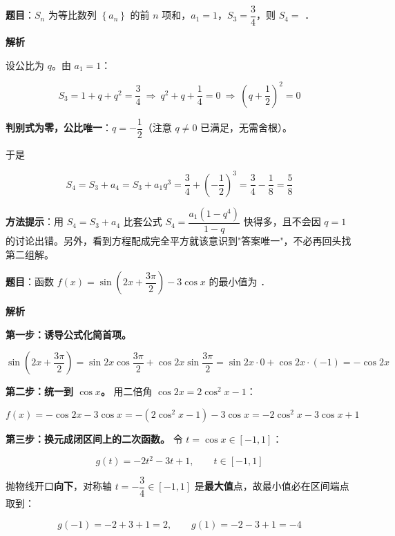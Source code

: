 
\par\medskip


\textbf{题目}：$S_n$ 为等比数列 $\left\{a_n\right\}$ 的前 $n$ 项和，$a_1=1$，$S_3=\dfrac34$，则 $S_4=$ \gkblank{}．

\textbf{解析}

设公比为 $q$。由 $a_1=1$：

\[S_3=1+q+q^{2}=\frac34\ \Longrightarrow\ q^{2}+q+\frac14=0\ \Longrightarrow\ \left(q+\frac12\right)^{2}=0\]

\textbf{判别式为零，公比唯一}：$q=-\dfrac12$（注意 $q\ne0$ 已满足，无需舍根）。

于是

\[S_4=S_3+a_4=S_3+a_1q^{3}=\frac34+\left(-\frac12\right)^{3}=\frac34-\frac18=\frac58\]


\begin{gktip}
\textbf{方法提示}：用 $S_4=S_3+a_4$ 比套公式 $S_4=\dfrac{a_1\left(1-q^{4}\right)}{1-q}$ 快得多，且不会因 $q=1$ 的讨论出错。另外，看到方程配成完全平方就该意识到"答案唯一"，不必再回头找第二组解。
\end{gktip}

\par\medskip


\textbf{题目}：函数 $f(x)=\sin\left(2x+\dfrac{3\pi}2\right)-3\cos x$ 的最小值为 \gkblank{}．

\textbf{解析}

\textbf{第一步：诱导公式化简首项。}

\[\sin\left(2x+\frac{3\pi}2\right)=\sin2x\cos\frac{3\pi}2+\cos2x\sin\frac{3\pi}2=\sin2x\cdot0+\cos2x\cdot(-1)=-\cos2x\]

\textbf{第二步：统一到 $\cos x$。} 用二倍角 $\cos2x=2\cos^{2}x-1$：

\[f(x)=-\cos2x-3\cos x=-\left(2\cos^{2}x-1\right)-3\cos x=-2\cos^{2}x-3\cos x+1\]

\textbf{第三步：换元成闭区间上的二次函数。} 令 $t=\cos x\in[-1,1]$：

\[g(t)=-2t^{2}-3t+1,\qquad t\in[-1,1]\]

抛物线开口\textbf{向下}，对称轴 $t=-\dfrac34\in[-1,1]$ 是\textbf{最大值}点，故最小值必在区间端点取到：

\[g(-1)=-2+3+1=2,\qquad g(1)=-2-3+1=-4\]

